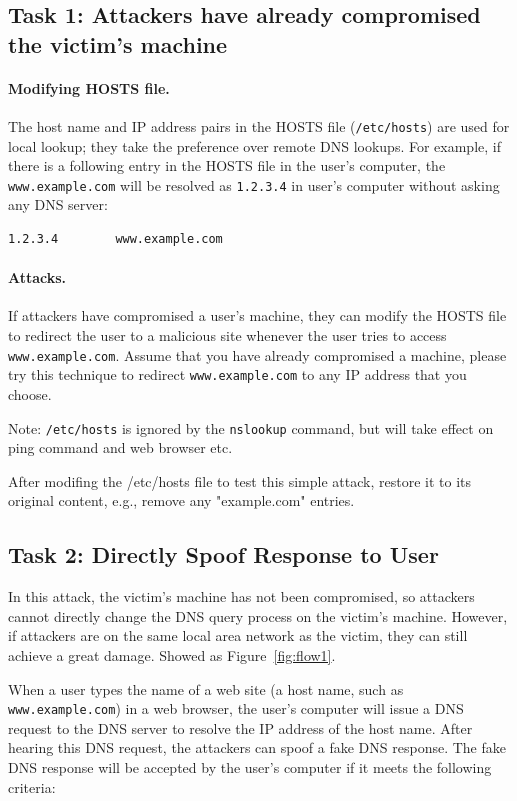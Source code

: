 \subsection{Task 1: Attackers have already compromised the victim's machine}

\paragraph{Modifying HOSTS file.}
The host name and IP address pairs in the HOSTS file (\texttt{/etc/hosts}) 
are used for local lookup; they take the preference over 
remote DNS lookups. For example, if there is a following 
entry in the HOSTS file in the user's computer, 
the \texttt{www.example.com} will be resolved as \texttt{1.2.3.4} in 
user's computer without asking any DNS server:
\begin{verbatim}
1.2.3.4        www.example.com
\end{verbatim}

\paragraph{Attacks.}
If attackers have compromised a user's machine, they can 
modify the HOSTS file to redirect the user to a malicious site
whenever the user tries to access {\tt www.example.com}. Assume that you have 
already compromised a machine, please try this technique to redirect
{\tt www.example.com} to any IP address that you choose.

Note: \texttt{/etc/hosts} is ignored by the {\tt nslookup} command, 
but will take effect on ping command and web browser etc.

After modifing the /etc/hosts file to test this simple attack, restore it
to its original content, e.g., remove any "example.com" entries.

\subsection{Task 2: Directly Spoof Response to User}

In this attack, the victim's machine has not been compromised, so attackers cannot
directly change the DNS query process on the victim's machine. However,
if attackers are on the same local area network as the victim, they 
can still achieve a great damage. Showed as Figure~\ref{fig:flow1}.

When a user types the name of a web site (a host name, such as {\tt www.example.com})
in a web browser, the user's computer will issue a DNS request to the DNS 
server to resolve the IP address of the host name.  After hearing this DNS 
request, the attackers can spoof a fake DNS response\cite{bib6}. The fake DNS response 
will be accepted by the user's computer if it meets 
the following criteria:

